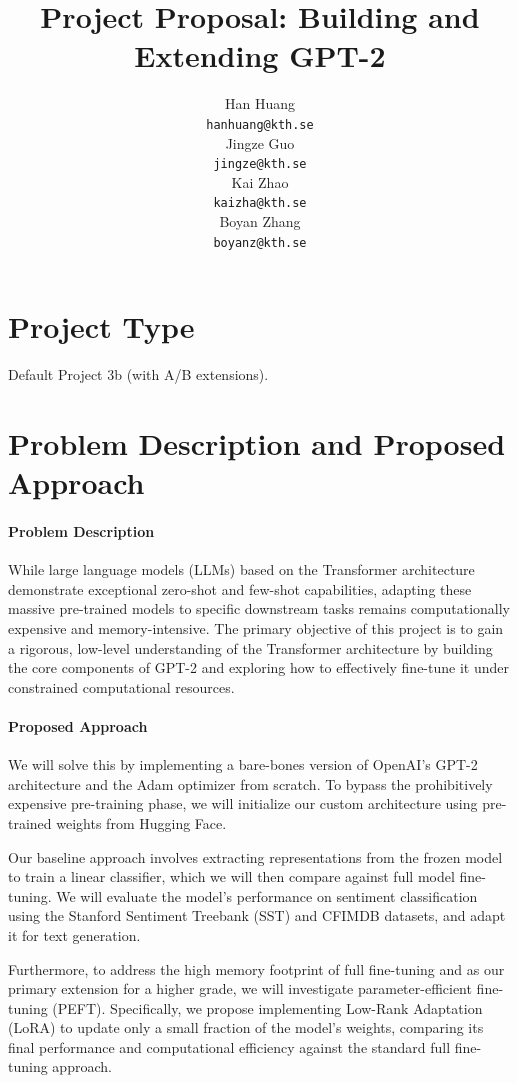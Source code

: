 \documentclass{article}
\title{Project Proposal: Building and Extending GPT-2}
\author{%
  Han Huang \\
  \texttt{hanhuang@kth.se} \\
  \And
  Jingze Guo\\
  \texttt{jingze@kth.se} \\
  \AND
  Kai Zhao\\
  \texttt{kaizha@kth.se} \\
  \And
  Boyan Zhang \\
  \texttt{boyanz@kth.se} \\
}
\begin{document}
\maketitle

\section{Project Type}
Default Project 3b (with A/B extensions).

\section{Problem Description and Proposed Approach}

\paragraph{Problem Description} 
While large language models (LLMs) based on the Transformer architecture demonstrate exceptional zero-shot and few-shot capabilities, adapting these massive pre-trained models to specific downstream tasks remains computationally expensive and memory-intensive. The primary objective of this project is to gain a rigorous, low-level understanding of the Transformer architecture by building the core components of GPT-2 and exploring how to effectively fine-tune it under constrained computational resources.

\paragraph{Proposed Approach} 
We will solve this by implementing a bare-bones version of OpenAI’s GPT-2 architecture and the Adam optimizer from scratch. To bypass the prohibitively expensive pre-training phase, we will initialize our custom architecture using pre-trained weights from Hugging Face.

Our baseline approach involves extracting representations from the frozen model to train a linear classifier, which we will then compare against full model fine-tuning. We will evaluate the model's performance on sentiment classification using the Stanford Sentiment Treebank (SST) and CFIMDB datasets, and adapt it for text generation.

Furthermore, to address the high memory footprint of full fine-tuning and as our primary extension for a higher grade, we will investigate parameter-efficient fine-tuning (PEFT). Specifically, we propose implementing Low-Rank Adaptation (LoRA) to update only a small fraction of the model's weights, comparing its final performance and computational efficiency against the standard full fine-tuning approach.
\end{document}
